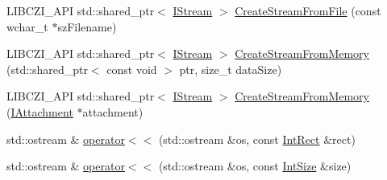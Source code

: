\begin{DoxyCompactItemize}
\item 
L\+I\+B\+C\+Z\+I\+\_\+\+A\+PI std\+::shared\+\_\+ptr$<$ \hyperlink{classlib_c_z_i_1_1_i_stream}{I\+Stream} $>$ \hyperlink{namespacelib_c_z_i_a8783cf40c0eac418632db90c4f20b43b}{Create\+Stream\+From\+File} (const wchar\+\_\+t $\ast$sz\+Filename)
\item 
L\+I\+B\+C\+Z\+I\+\_\+\+A\+PI std\+::shared\+\_\+ptr$<$ \hyperlink{classlib_c_z_i_1_1_i_stream}{I\+Stream} $>$ \hyperlink{namespacelib_c_z_i_afc0c5e268aa30fc812911a1a6eef44fb}{Create\+Stream\+From\+Memory} (std\+::shared\+\_\+ptr$<$ const void $>$ ptr, size\+\_\+t data\+Size)
\item 
L\+I\+B\+C\+Z\+I\+\_\+\+A\+PI std\+::shared\+\_\+ptr$<$ \hyperlink{classlib_c_z_i_1_1_i_stream}{I\+Stream} $>$ \hyperlink{namespacelib_c_z_i_a27a30c227f027817b36e29ac259b270c}{Create\+Stream\+From\+Memory} (\hyperlink{classlib_c_z_i_1_1_i_attachment}{I\+Attachment} $\ast$attachment)
\item 
std\+::ostream \& \hyperlink{namespacelib_c_z_i_aee5b36178903cd959cd840973309c4bb}{operator$<$$<$} (std\+::ostream \&os, const \hyperlink{structlib_c_z_i_1_1_int_rect}{Int\+Rect} \&rect)
\item 
std\+::ostream \& \hyperlink{namespacelib_c_z_i_aa572fb9812d1569dc1afbcef03fbc3ee}{operator$<$$<$} (std\+::ostream \&os, const \hyperlink{structlib_c_z_i_1_1_int_size}{Int\+Size} \&size)
\end{DoxyCompactItemize}
